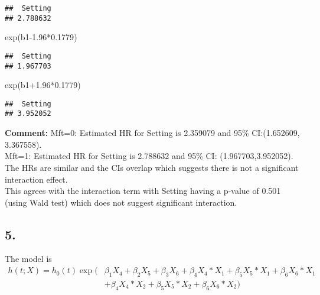 \documentclass[
]{article}
\newenvironment{Shaded}{\begin{snugshade}}{\end{snugshade}}
\newcommand{\FloatTok}[1]{\textcolor[rgb]{0.00,0.00,0.81}{#1}}
\newcommand{\FunctionTok}[1]{\textcolor[rgb]{0.00,0.00,0.00}{#1}}
\newcommand{\NormalTok}[1]{#1}
\newcommand{\SpecialCharTok}[1]{\textcolor[rgb]{0.00,0.00,0.00}{#1}}
\begin{document}
\begin{verbatim}
##  Setting 
## 2.788632
\end{verbatim}

\begin{Shaded}
\begin{Highlighting}[]
\FunctionTok{exp}\NormalTok{(b1}\FloatTok{{-}1.96}\SpecialCharTok{*}\FloatTok{0.1779}\NormalTok{)}
\end{Highlighting}
\end{Shaded}

\begin{verbatim}
##  Setting 
## 1.967703
\end{verbatim}

\begin{Shaded}
\begin{Highlighting}[]
\FunctionTok{exp}\NormalTok{(b1}\FloatTok{+1.96}\SpecialCharTok{*}\FloatTok{0.1779}\NormalTok{)}
\end{Highlighting}
\end{Shaded}

\begin{verbatim}
##  Setting 
## 3.952052
\end{verbatim}

\textbf{Comment:} Mft=0: Estimated HR for Setting is 2.359079 and 95\%
CI:(1.652609, 3.367558).\\
Mft=1: Estimated HR for Setting is 2.788632 and 95\% CI:
(1.967703,3.952052).\\
The HRs are similar and the CIs overlap which suggests there is not a
significant interaction effect.\\
This agrees with the interaction term with Setting having a p-value of
0.501 (using Wald test) which does not suggest significant interaction.

\hypertarget{section}{%
\subsection{5.}\label{section}}

The model is \begin{align*}
h(t;X)=h_0(t)\exp(&\beta_1 X_4 +  \beta_2 X_5 + \beta_3 X_6 + \beta_4 X_4*X_1 + \beta_5 X_5*X_1 + \beta_6 X_6*X_1 \\
                  &+\beta_4 X_4*X_2 + \beta_5 X_5*X_2 + \beta_6 X_6*X_2)
\end{align*}
\end{document}
